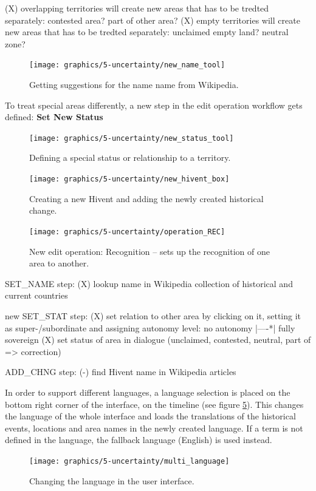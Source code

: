 (X) overlapping territories will create new areas that has to be tredted separately:
  contested area? part of other area?
(X) empty territories will create new areas that has to be tredted separately:
  unclaimed empty land? neutral zone?


\begin{figure}[ht]
  \centering
  \texttt{[image: graphics/5-uncertainty/new\_name\_tool]}
  \caption{Getting suggestions for the name name from Wikipedia.}
  \label{fig:uncertainty_new_name_tool}
\end{figure}


To treat special areas differently, a new step in the edit operation workflow gets defined: \textbf{Set New Status}

\begin{figure}[ht]
  \centering
  \texttt{[image: graphics/5-uncertainty/new\_status\_tool]}
  \caption{Defining a special status or relationship to a territory.}
  \label{fig:uncertainty_new_status_tool}
\end{figure}


\begin{figure}[ht]
  \centering
  \texttt{[image: graphics/5-uncertainty/new\_hivent\_box]}
  \caption{Creating a new Hivent and adding the newly created historical change.}
  \label{fig:uncertainty_new_hivent_box}
\end{figure}


\begin{figure}[ht]
  \centering
  \texttt{[image: graphics/5-uncertainty/operation\_REC]}
  \caption{New edit operation: Recognition -- sets up the recognition of one area to another.}
  \label{fig:uncertainty_operation_REC}
\end{figure}

\newpage

SET\_NAME step:
(X) lookup name in Wikipedia collection of historical and current countries

new SET\_STAT step:
(X) set relation to other area by clicking on it, setting it as super-/subordinate and assigning autonomy level:
no autonomy |----*| fully sovereign
(X) set status of area in dialogue (unclaimed, contested, neutral, part of => correction)


ADD\_CHNG step:
(-) find Hivent name in Wikipedia articles


In order to support different languages, a language selection is placed on the bottom right corner of the interface, on the timeline (see figure \ref{fig:multi_language}). This changes the language of the whole interface and loads the translations of the historical events, locations and area names in the newly created language. If a term is not defined in the language, the fallback language (English) is used instead.
\begin{figure}[ht]
  \centering
  \texttt{[image: graphics/5-uncertainty/multi\_language]}
  \caption{Changing the language in the user interface.}
  \label{fig:multi_language}
\end{figure}




